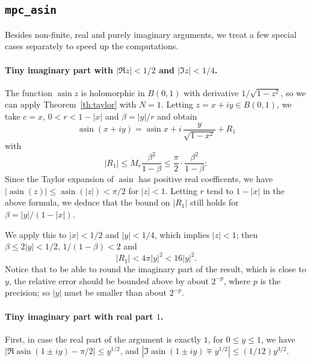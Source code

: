 \documentclass [11pt]{article}
\newcommand {\asin}{\operatorname {asin}}
\renewcommand {\leq}{\leqslant}
\begin{document}
\subsection {\texttt {mpc\_asin}}

Besides non-finite, real and purely imaginary arguments, we treat a few
special cases separately to speed up the computations.

\paragraph{Tiny imaginary part with $|\Re z| < 1/2$ and $|\Im z| < 1/4$.}
The function $\asin z$ is holomorphic in $B (0, 1)$
with derivative $1/\sqrt{1-z^2}$, so we can apply Theorem~\ref {th:taylor}
with $N = 1$.
Letting $z = x + i y \in B (0, 1)$, we take $c = x$, $0 < r < 1 - |x|$
and $\beta = |y| / r$ and obtain
\[
\asin (x + i y) = \asin x + i \, \frac{y}{\sqrt {1 - x^2}} + R_1
\]
with
\[
|R_1| \leq M_r \frac {\beta^2}{1 - \beta}
\leq \frac {\pi}{2} \cdot \frac {\beta^2}{1 - \beta}:
\]
Since the Taylor expansion of $\asin$ has positive real coefficents,
we have $|\asin (z)| \leq \asin (|z|) < \pi / 2$ for $|z| < 1$.
Letting $r$ tend to $1 - |x|$ in the above formula, we deduce that the
bound on $|R_1|$ still holds for $\beta = |y| / (1 - |x|)$.

We apply this to $|x| < 1/2$ and $|y| < 1/4$, which implies $|z| < 1$;
then $\beta \leq 2 |y| < 1/2$, $1 / (1 - \beta) < 2$ and
\[
|R_1| < 4 \pi |y|^2 < 16 |y|^2.
\]
Notice that to be able to round the imaginary part of the result,
which is close to $y$, the relative error should be bounded above by
about $2^{-p}$, where $p$ is the precision; so $|y|$ must be smaller
than about $2^{-p}$.


\paragraph{Tiny imaginary part with real part $1$.}
First, in case the real part of the argument is exactly $1$,
for $0 \leq y \leq 1$, we have $|\Re \asin (1 \pm iy) - \pi/2|
\leq y^{1/2}$, and $|\Im \asin (1 \pm iy) \mp y^{1/2}| \leq (1/12) y^{3/2}$.
\end{document}
